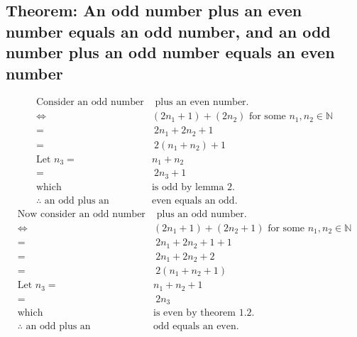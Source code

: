 \documentclass[11pt, oneside]{article}   	%
\begin{document}
	\subsection{Theorem: An odd number plus an even number equals an odd number, and an odd number plus an odd number equals an even number}
		\begin{align*}
			\text{Consider an odd number}&\text{ plus an even number.}\\
			\iff & (2n_1+1) + (2n_2) \text{ for some } n_1, n_2 \in \mathbb{N}\\
			= &\ 2n_1 + 2n_2 + 1\\
			= &\ 2(n_1 + n_2) + 1\\
			\text{Let } n_3 =& n_1 + n_2\\
			= &\ 2n_3 + 1\\
			\text{which }& \text{is odd by lemma 2}.\\
			\therefore \text{ an odd plus an }&\text{even equals an odd.}
		\end{align*}
		\begin{align*}
			\text{Now consider an odd number}&\text{ plus an odd number.}\\
			\iff & (2n_1+1) + (2n_2+1) \text{ for some } n_1, n_2 \in \mathbb{N}\\
			= &\ 2n_1 + 2n_2 + 1 + 1\\
			= &\ 2n_1 + 2n_2 + 2\\
			= &\ 2(n_1 + n_2 + 1)\\
			\text{Let } n_3 = & n_1 + n_2 + 1\\
			= &\ 2n_3\\
			\text{which }& \text{is even by theorem 1.2}.\\
			\therefore \text{ an odd plus an }&\text{odd equals an even.}
		\end{align*}

\section{}
\end{document}
